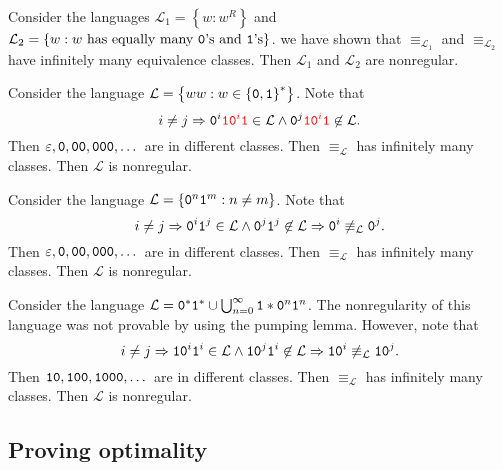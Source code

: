 \documentclass{notes}
\begin{document}
\begin{eg}
  Consider the languages $\mathcal L_1 = \left \{ w : w^R \right \}$ and $\mathcal L_2 = \left \{ w : \text{$w$ has equally many \verb~0~'s and \verb~1~'s} \right \}$.
  we have shown that $\equiv_{\mathcal L_1}$ and $\equiv_{\mathcal L_2}$ have infinitely many equivalence classes.
  Then $\mathcal L_1$ and $\mathcal L_2$ are nonregular.
\end{eg}

\begin{eg}
  Consider the language $\mathcal L = \left \{ ww : w \in \left \{ \verb~0~, \verb~1~ \right \}^* \right \}$.
  Note that 
  \[
    i \neq j \Rightarrow \verb~0~^i {\color{red} \verb~10~^i \verb~1~} \in \mathcal L \land \verb~0~^j {\color{red} \verb~10~^i \verb~1~} \not \in \mathcal L.
  \]
  Then $\varepsilon, \verb~0~, \verb~00~, \verb~000~, \dots$ are in different classes.
  Then $\equiv_\mathcal L$ has infinitely many classes.
  Then $\mathcal L$ is nonregular.
\end{eg}

\begin{eg}
  Consider the language $\mathcal L = \left \{ \verb~0~^n \verb~1~^m : n \neq m \right \}$.
  Note that 
  \[
    i \neq j \Rightarrow \verb~0~^i \verb~1~^j \in \mathcal L \land \verb~0~^j \verb~1~^j \not \in \mathcal L \Rightarrow \verb~0~^i \not \equiv_\mathcal L \verb~0~^j.
  \]
  Then $\varepsilon, \verb~0~, \verb~00~, \verb~000~, \dots$ are in different classes.
  Then $\equiv_\mathcal L$ has infinitely many classes.
  Then $\mathcal L$ is nonregular.
\end{eg}

\begin{eg}
  Consider the language $\mathcal L = \verb~0~^* \verb~1~^* \cup \bigcup_{n = 0}^\infty \verb~1~* \verb~0~^n \verb~1~^n$.
  The nonregularity of this language was not provable by using the pumping lemma.
  However, note that 
  \[
    i \neq j \Rightarrow \verb~10~^i \verb~1~^i \in \mathcal L \land \verb~10~^j \verb~1~^i \not \in \mathcal L \Rightarrow \verb~10~^i \not \equiv_\mathcal L \verb~10~^j.
  \]
  Then $\verb~10~, \verb~100~, \verb~1000~, \dots$ are in different classes.
  Then $\equiv_\mathcal L$ has infinitely many classes.
  Then $\mathcal L$ is nonregular.
\end{eg}

\newpage

\subsection{Proving optimality}
\end{document}
